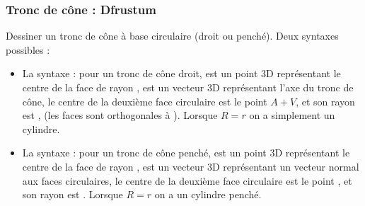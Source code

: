 \subsubsection{Tronc de cône : Dfrustum}

Dessiner un tronc de cône à base circulaire (droit ou penché). Deux syntaxes possibles :

\begin{itemize}
    \item La syntaxe :  pour un tronc de cône droit,  est un point 3D représentant le centre de la face de rayon ,  est un vecteur 3D représentant l'axe du tronc de cône, le centre de la deuxième face circulaire est le point $A+V$, et son rayon est ,  (les faces sont orthogonales à ). Lorsque $R=r$ on a simplement un cylindre.
    
    \item La syntaxe :  pour un tronc de cône penché,  est un point 3D représentant le centre de la face de rayon ,  est un vecteur 3D représentant un vecteur normal aux faces circulaires, le centre de la deuxième face circulaire est le point , et son rayon est . Lorsque $R=r$ on a un cylindre penché.
\end{itemize}

